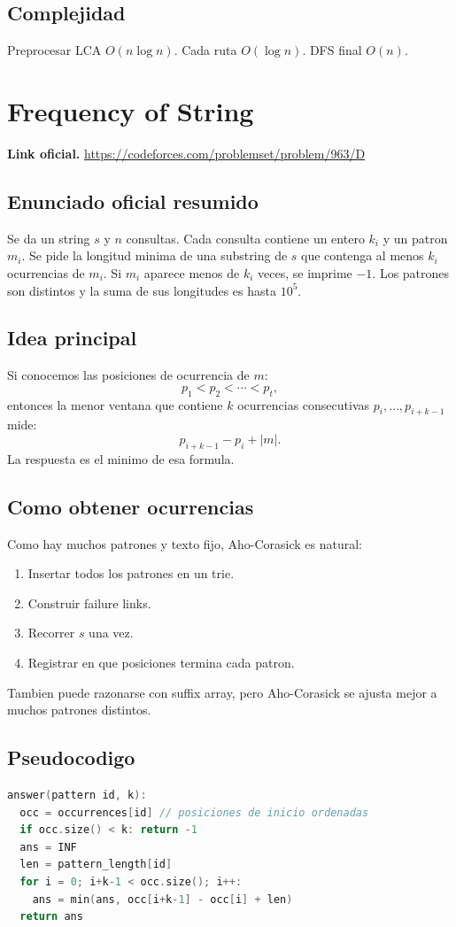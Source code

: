 \documentclass[10pt]{article}
\newcommand{\bigO}{O}
\begin{document}
\subsection{Complejidad}
Preprocesar LCA $\bigO(n\log n)$. Cada ruta $\bigO(\log n)$. DFS final
$\bigO(n)$.

\newpage

\section{Frequency of String}
\textbf{Link oficial.} \url{https://codeforces.com/problemset/problem/963/D}

\subsection{Enunciado oficial resumido}
Se da un string $s$ y $n$ consultas. Cada consulta contiene un entero $k_i$ y un
patron $m_i$. Se pide la longitud minima de una substring de $s$ que contenga al
menos $k_i$ ocurrencias de $m_i$. Si $m_i$ aparece menos de $k_i$ veces, se
imprime $-1$. Los patrones son distintos y la suma de sus longitudes es hasta
$10^5$.

\subsection{Idea principal}
Si conocemos las posiciones de ocurrencia de $m$:
\[
p_1<p_2<\cdots<p_t,
\]
entonces la menor ventana que contiene $k$ ocurrencias consecutivas
$p_i,\ldots,p_{i+k-1}$ mide:
\[
p_{i+k-1}-p_i+|m|.
\]
La respuesta es el minimo de esa formula.

\subsection{Como obtener ocurrencias}
Como hay muchos patrones y texto fijo, Aho-Corasick es natural:
\begin{enumerate}[leftmargin=*]
\item Insertar todos los patrones en un trie.
\item Construir failure links.
\item Recorrer $s$ una vez.
\item Registrar en que posiciones termina cada patron.
\end{enumerate}
Tambien puede razonarse con suffix array, pero Aho-Corasick se ajusta mejor a
muchos patrones distintos.

\subsection{Pseudocodigo}
\begin{lstlisting}[language=C++]
answer(pattern id, k):
  occ = occurrences[id] // posiciones de inicio ordenadas
  if occ.size() < k: return -1
  ans = INF
  len = pattern_length[id]
  for i = 0; i+k-1 < occ.size(); i++:
    ans = min(ans, occ[i+k-1] - occ[i] + len)
  return ans
\end{lstlisting}
\end{document}
